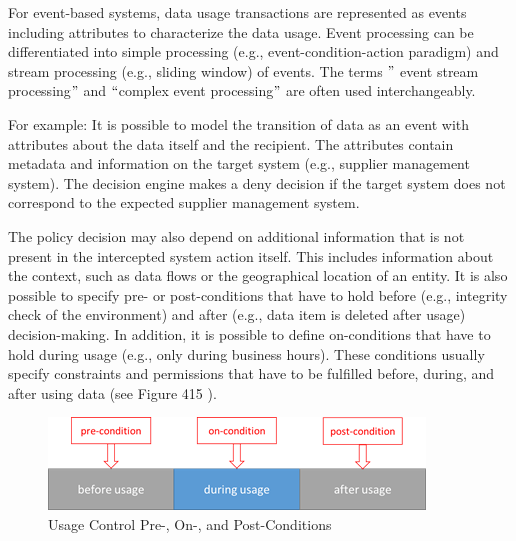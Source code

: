 \par


For event-based systems, data usage transactions are represented as events including attributes to characterize the data usage. Event processing can be differentiated into simple processing (e.g., event-condition-action paradigm) and stream processing (e.g., sliding window) of events. The terms $"$ event stream processing$"$  and $``$complex event processing$"$  are often used interchangeably.

For example: It is possible to model the transition of data as an event with attributes about the data itself and the recipient. The attributes contain metadata and information on the target system (e.g., supplier management system). The decision engine makes a deny decision if the target system does not correspond to the expected supplier management system.

The policy decision may also depend on additional information that is not present in the intercepted system action itself. This includes information about the context, such as data flows or the geographical location of an entity. It is also possible to specify pre- or post-conditions that have to hold before (e.g., integrity check of the environment) and after (e.g., data item is deleted after usage) decision-making. In addition, it is possible to define on-conditions that have to hold during usage (e.g., only during business hours). These conditions usually specify constraints and permissions that have to be fulfilled before, during, and after using data (see  Figure 415   ). 




\begin{figure}[H]
	\begin{Center}
		\includegraphics[width=3.94in,height=0.97in]{./media/image71.png}
		\caption{Usage Control Pre-, On-, and Post-Conditions}
		\label{fig:Usage_Control_Pre-_On-_and Post-Conditions}
	\end{Center}
\end{figure}


